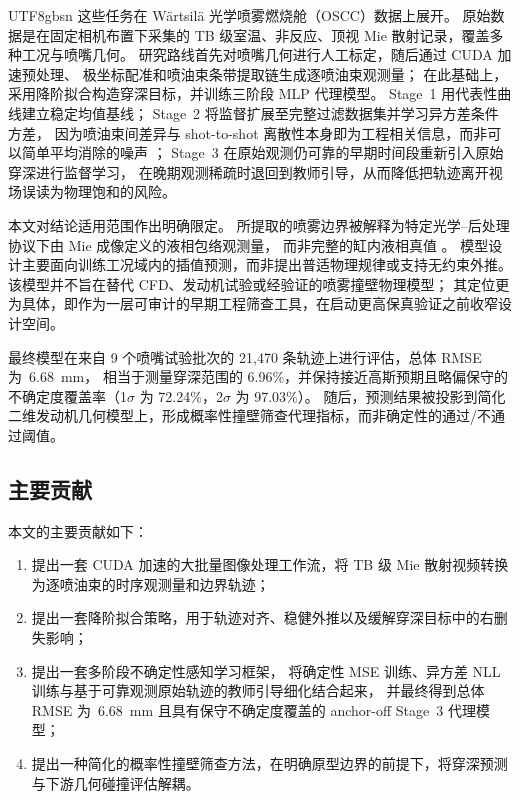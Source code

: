 \documentclass[english, 12pt, a4paper, elec, utf8, a-2b, online]{aaltothesis}
\begin{document}
\begin{CJK*}{UTF8}{gbsn}
这些任务在 Wärtsilä 光学喷雾燃烧舱（OSCC）数据上展开。
原始数据是在固定相机布置下采集的 TB 级室温、非反应、顶视 Mie 散射记录，覆盖多种工况与喷嘴几何。
研究路线首先对喷嘴几何进行人工标定，随后通过 CUDA 加速预处理、
极坐标配准和喷油束条带提取链生成逐喷油束观测量；
在此基础上，采用降阶拟合构造穿深目标，并训练三阶段 MLP 代理模型。
Stage~1 用代表性曲线建立稳定均值基线；
Stage~2 将监督扩展至完整过滤数据集并学习异方差条件方差，
因为喷油束间差异与 shot-to-shot 离散性本身即为工程相关信息，而非可以简单平均消除的噪声 \cite{KendallGal2017}；
Stage~3 在原始观测仍可靠的早期时间段重新引入原始穿深进行监督学习，
在晚期观测稀疏时退回到教师引导，从而降低把轨迹离开视场误读为物理饱和的风险。

本文对结论适用范围作出明确限定。
所提取的喷雾边界被解释为特定光学--后处理协议下由 Mie 成像定义的液相包络观测量，
而非完整的缸内液相真值 \cite{ecn_liquid_penetration,ecn_liquid_penetration_accessory}。
模型设计主要面向训练工况域内的插值预测，而非提出普适物理规律或支持无约束外推。
该模型并不旨在替代 CFD、发动机试验或经验证的喷雾撞壁物理模型；
其定位更为具体，即作为一层可审计的早期工程筛查工具，在启动更高保真验证之前收窄设计空间。

最终模型在来自 9 个喷嘴试验批次的 21{,}470 条轨迹上进行评估，总体 RMSE 为~\SI{6.68}{mm}，
相当于测量穿深范围的 6.96\%，并保持接近高斯预期且略偏保守的不确定度覆盖率（1$\sigma$ 为 72.24\%，2$\sigma$ 为 97.03\%）。
随后，预测结果被投影到简化二维发动机几何模型上，形成概率性撞壁筛查代理指标，而非确定性的通过/不通过阈值。

\subsection{主要贡献}

本文的主要贡献如下：
\begin{enumerate}
  \item 提出一套 CUDA 加速的大批量图像处理工作流，将 TB 级 Mie 散射视频转换为逐喷油束的时序观测量和边界轨迹；
  \item 提出一套降阶拟合策略，用于轨迹对齐、稳健外推以及缓解穿深目标中的右删失影响；
  \item 提出一套多阶段不确定性感知学习框架，
  将确定性 MSE 训练、异方差 NLL 训练与基于可靠观测原始轨迹的教师引导细化结合起来，
  并最终得到总体 RMSE 为~\SI{6.68}{mm} 且具有保守不确定度覆盖的 anchor-off Stage~3 代理模型；
  \item 提出一种简化的概率性撞壁筛查方法，在明确原型边界的前提下，将穿深预测与下游几何碰撞评估解耦。
\end{enumerate}


\end{CJK*}
\end{document}
